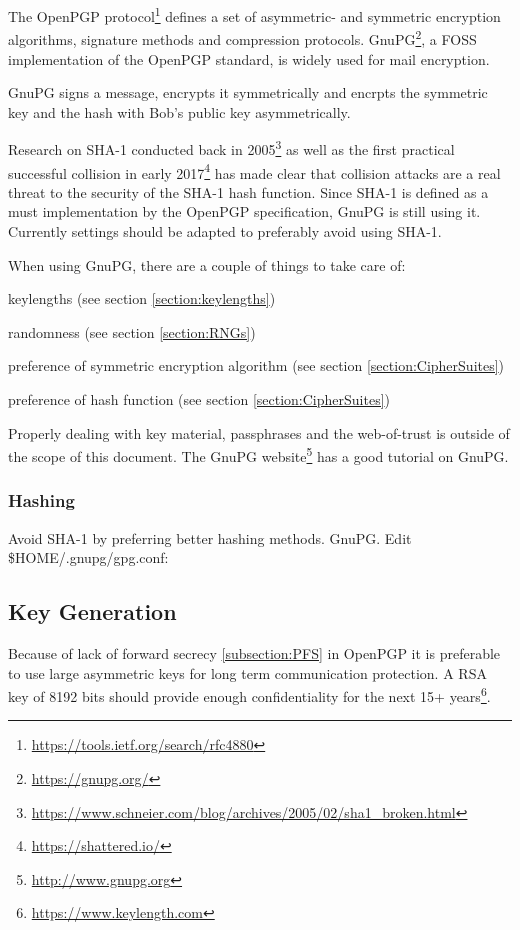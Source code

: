 \gdef\currentsectionname{GPG}
\gdef\currentsubsectionname{GnuPG}

The OpenPGP protocol\footnote{\url{https://tools.ietf.org/search/rfc4880}} defines a set of asymmetric- and symmetric encryption algorithms, signature methods and compression protocols. GnuPG\footnote{\url{https://gnupg.org/}}, a FOSS implementation of the OpenPGP standard, is widely used for mail encryption.
 
GnuPG signs a message, encrypts it symmetrically and encrpts the symmetric key and the hash with Bob's public key asymmetrically.

Research on SHA-1 conducted back in 2005\footnote{\url{https://www.schneier.com/blog/archives/2005/02/sha1\_broken.html}} as well as the first practical successful collision in early 2017\footnote{\url{https://shattered.io/}} has made clear that collision attacks are a real threat to the security of the SHA-1 hash function. Since SHA-1 is defined as a must implementation by the OpenPGP specification, GnuPG is still using it. Currently settings should be adapted to preferably avoid using SHA-1. 

When using GnuPG, there are a couple of things to take care of:
\begin{itemize*}
  \item keylengths (see section \ref{section:keylengths})
  \item randomness (see section \ref{section:RNGs})
  \item preference of symmetric encryption algorithm (see section \ref{section:CipherSuites})
  \item preference of hash function (see section \ref{section:CipherSuites})
\end{itemize*}

Properly dealing with key material, passphrases and the web-of-trust is outside of the scope of this document. The GnuPG
website\footnote{\url{http://www.gnupg.org}} has a good tutorial on GnuPG.

\subsubsection{Hashing}
Avoid SHA-1 by preferring better hashing methods. GnuPG. Edit \$HOME/.gnupg/gpg.conf:


\subsection{Key Generation}
\gdef\currentsectionname{GPG}
\gdef\currentsubsectionname{GnuPG}
Because of lack of forward secrecy \ref{subsection:PFS} in OpenPGP it is preferable to use large asymmetric keys for long term
communication protection. A RSA key of 8192 bits should provide enough confidentiality for the next 15+ years\footnote{\url{https://www.keylength.com}}.

